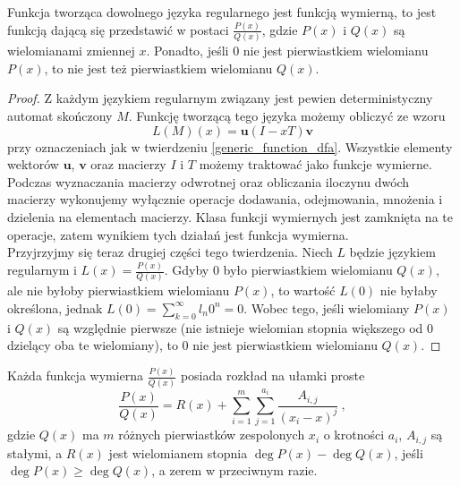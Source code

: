 \begin{theorem}
    Funkcja tworząca dowolnego języka regularnego jest funkcją wymierną, to jest funkcją dającą się przedstawić w postaci $\frac{P(x)}{Q(x)}$, gdzie $P(x)$ i $Q(x)$ są wielomianami zmiennej $x$. Ponadto, jeśli $0$ nie jest pierwiastkiem wielomianu $P(x)$, to nie jest też pierwiastkiem wielomianu $Q(x)$.
\end{theorem}
\begin{proof}
    Z każdym językiem regularnym związany jest pewien deterministyczny automat skończony $M$. Funkcję tworzącą tego języka możemy obliczyć ze wzoru $$L(M)(x)=\mathbf{u}(I-xT)\mathbf{v}$$ przy oznaczeniach jak w twierdzeniu \ref{generic_function_dfa}. Wszystkie elementy wektorów $\mathbf{u}$, $\mathbf{v}$ oraz macierzy $I$ i $T$ możemy traktować jako funkcje wymierne. Podczas wyznaczania macierzy odwrotnej oraz obliczania iloczynu dwóch macierzy wykonujemy wyłącznie operacje dodawania, odejmowania, mnożenia i dzielenia na elementach macierzy. Klasa funkcji wymiernych jest zamknięta na te operacje, zatem wynikiem tych działań jest funkcja wymierna.\\
    Przyjrzyjmy się teraz drugiej części tego twierdzenia. Niech $L$ będzie językiem regularnym i $L(x)=\frac{P(x)}{Q(x)}$. Gdyby $0$ było pierwiastkiem wielomianu $Q(x)$, ale nie byłoby pierwiastkiem wielomianu $P(x)$, to wartość $L(0)$ nie byłaby określona, jednak $L(0)=\sum_{k=0}^{\infty}{l_n0^n}=0$. Wobec tego, jeśli wielomiany $P(x)$ i $Q(x)$ są względnie pierwsze (nie istnieje wielomian stopnia większego od $0$ dzielący oba te wielomiany), to $0$ nie jest pierwiastkiem wielomianu $Q(x)$.
\end{proof}

\begin{theorem}
    Każda funkcja wymierna $\frac{P(x)}{Q(x)}$ posiada rozkład na ułamki proste
    $$\frac{P(x)}{Q(x)}=R(x)+\sum_{i=1}^{m}{\sum_{j=1}^{a_i}{\frac{A_{i,j}}{(x_i-x)^{j}}}}~,$$
    gdzie $Q(x)$ ma $m$ różnych pierwiastków zespolonych $x_i$ o krotności $a_i$, $A_{i,j}$ są stałymi, a $R(x)$ jest wielomianem stopnia $\deg{P(x)}-\deg{Q(x)}$, jeśli $\deg{P(x)}\geq\deg{Q(x)}$, a zerem w przeciwnym razie.
\end{theorem}

